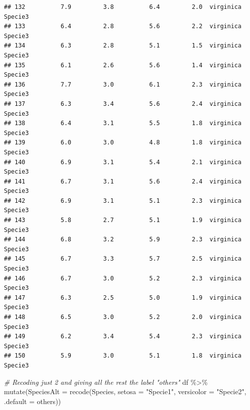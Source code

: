 \documentclass[
]{book}
\newenvironment{Shaded}{\begin{snugshade}}{\end{snugshade}}
\newcommand{\AttributeTok}[1]{\textcolor[rgb]{0.77,0.63,0.00}{#1}}
\newcommand{\CommentTok}[1]{\textcolor[rgb]{0.56,0.35,0.01}{\textit{#1}}}
\newcommand{\FunctionTok}[1]{\textcolor[rgb]{0.00,0.00,0.00}{#1}}
\newcommand{\NormalTok}[1]{#1}
\newcommand{\SpecialCharTok}[1]{\textcolor[rgb]{0.00,0.00,0.00}{#1}}
\newcommand{\StringTok}[1]{\textcolor[rgb]{0.31,0.60,0.02}{#1}}
\begin{document}
\begin{verbatim}
## 132          7.9         3.8          6.4         2.0  virginica    Specie3
## 133          6.4         2.8          5.6         2.2  virginica    Specie3
## 134          6.3         2.8          5.1         1.5  virginica    Specie3
## 135          6.1         2.6          5.6         1.4  virginica    Specie3
## 136          7.7         3.0          6.1         2.3  virginica    Specie3
## 137          6.3         3.4          5.6         2.4  virginica    Specie3
## 138          6.4         3.1          5.5         1.8  virginica    Specie3
## 139          6.0         3.0          4.8         1.8  virginica    Specie3
## 140          6.9         3.1          5.4         2.1  virginica    Specie3
## 141          6.7         3.1          5.6         2.4  virginica    Specie3
## 142          6.9         3.1          5.1         2.3  virginica    Specie3
## 143          5.8         2.7          5.1         1.9  virginica    Specie3
## 144          6.8         3.2          5.9         2.3  virginica    Specie3
## 145          6.7         3.3          5.7         2.5  virginica    Specie3
## 146          6.7         3.0          5.2         2.3  virginica    Specie3
## 147          6.3         2.5          5.0         1.9  virginica    Specie3
## 148          6.5         3.0          5.2         2.0  virginica    Specie3
## 149          6.2         3.4          5.4         2.3  virginica    Specie3
## 150          5.9         3.0          5.1         1.8  virginica    Specie3
\end{verbatim}

\begin{Shaded}
\begin{Highlighting}[]
\CommentTok{\# Recoding just 2 and giving all the rest the label "others"}
\NormalTok{df }\SpecialCharTok{\%\textgreater{}\%} 
  \FunctionTok{mutate}\NormalTok{(}\AttributeTok{SpeciesAlt =} \FunctionTok{recode}\NormalTok{(Species, }\AttributeTok{setosa =} \StringTok{"Specie1"}\NormalTok{,}
                             \AttributeTok{versicolor =} \StringTok{"Specie2"}\NormalTok{, }\AttributeTok{.default =} \StringTok{\textquotesingle{}others\textquotesingle{}}\NormalTok{))}
\end{Highlighting}
\end{Shaded}
\end{document}
